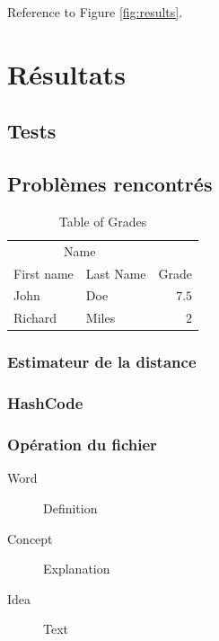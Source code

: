 \documentclass[fleqn,10pt,french]{SelfArx} %
\begin{document}
Reference to Figure \ref{fig:results}.


\section{Résultats}

\lipsum[10] %

\subsection{Tests}

\lipsum[11] %

\subsection{Problèmes rencontrés}

\lipsum[11] %

\begin{table}[hbt]
\caption{Table of Grades}
\centering
\begin{tabular}{llr}
\toprule
\multicolumn{2}{c}{Name} \\
\cmidrule(r){1-2}
First name & Last Name & Grade \\
\midrule
John & Doe & $7.5$ \\
Richard & Miles & $2$ \\
\bottomrule
\end{tabular}
\label{tab:label}
\end{table}

\subsubsection{Estimateur de la distance}

\lipsum[12] %

\subsubsection{HashCode}

\lipsum[12] %

\subsubsection{Opération du fichier}

\lipsum[12] %

\begin{description}
\item[Word] Definition
\item[Concept] Explanation
\item[Idea] Text
\end{description}
\end{document}
